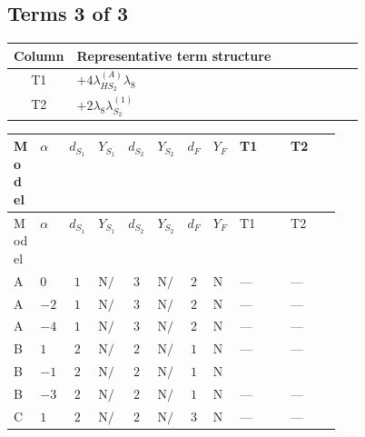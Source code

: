 \documentclass[8pt]{article}
\begin{document}
\begin{landscape}
\subsection*{Terms 3 of 3}
\begin{center}
\begin{tabular}{@{}c >{\raggedright\arraybackslash}p{0.82\linewidth}@{}}
\toprule
Column & Representative term structure \\
\midrule
T1 & \(\displaystyle +4 {\lambda_{HS_2}^{(A)}} {\lambda_{8}}\) \\
\midrule
T2 & \(\displaystyle +2 {\lambda_{8}} {\lambda_{S_2}^{(1)}}\) \\
\midrule
\bottomrule
\end{tabular}
\end{center}
\smallskip
\tiny
\begin{longtable}{@{}llcccccc >{\raggedright\arraybackslash}p{0.21\linewidth} >{\raggedright\arraybackslash}p{0.21\linewidth}@{}}
\toprule
Model & $\alpha$ & $d_{S_1}$ & $Y_{S_1}$ & $d_{S_2}$ & $Y_{S_2}$ & $d_F$ & $Y_F$ & T1 & T2 \\
\midrule
\endfirsthead
\toprule
Model & $\alpha$ & $d_{S_1}$ & $Y_{S_1}$ & $d_{S_2}$ & $Y_{S_2}$ & $d_F$ & $Y_F$ & T1 & T2 \\
\midrule
\endhead
A & $0$ & $1$ & $\text{N/A}$ & $3$ & $\text{N/A}$ & $2$ & $\text{N/A}$ & --- & --- \\
\midrule
A & $-2$ & $1$ & $\text{N/A}$ & $3$ & $\text{N/A}$ & $2$ & $\text{N/A}$ & --- & --- \\
\midrule
A & $-4$ & $1$ & $\text{N/A}$ & $3$ & $\text{N/A}$ & $2$ & $\text{N/A}$ & --- & --- \\
\midrule
B & $1$ & $2$ & $\text{N/A}$ & $2$ & $\text{N/A}$ & $1$ & $\text{N/A}$ & --- & --- \\
\midrule
B & $-1$ & $2$ & $\text{N/A}$ & $2$ & $\text{N/A}$ & $1$ & $\text{N/A}$ & \scriptsize\adjustbox{max width=\linewidth}{$\begin{gathered} +4 {\lambda_{HS_2}^{(A)}} {\lambda_{8}}\end{gathered}$} & \scriptsize\adjustbox{max width=\linewidth}{$\begin{gathered} +2 {\lambda_{8}} {\lambda_{S_2}^{(1)}}\end{gathered}$} \\
\midrule
B & $-3$ & $2$ & $\text{N/A}$ & $2$ & $\text{N/A}$ & $1$ & $\text{N/A}$ & --- & --- \\
\midrule
C & $1$ & $2$ & $\text{N/A}$ & $2$ & $\text{N/A}$ & $3$ & $\text{N/A}$ & --- & --- \\

\end{longtable}
\end{landscape}
\end{document}
